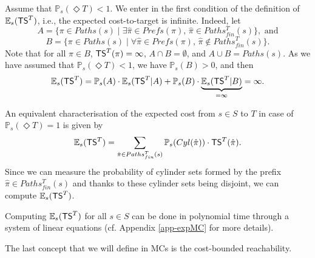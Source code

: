 \begin{remark}
Assume that $\mathbb{P}_s(\Diamond T) < 1$. We enter in the first condition of the definition of $\mathbb{E}_s(\text{\sffamily TS}^T)$, i.e., the expected cost-to-target is infinite. Indeed, let
\[A = \{\pi \in Paths(s) \; | \; \exists \hat{\pi} \in Prefs(\pi), \, \hat{\pi} \in Paths^T_{fin}(s)\}, \text{ and}\]
\[B=\{ \pi \in Paths(s) \; | \; \forall
\hat{\pi} \in Prefs(\pi), \, \hat{\pi} \not\in Paths^T_{fin}(s)\}.\]
Note that for all $\pi \in B$, $\text{\sffamily TS}^T(\pi) = \infty$,
$A \cap B = \emptyset$, and $A \cup B = Paths(s)$.
As we have assumed that $\mathbb{P}_s(\Diamond T) < 1$,
we have $\mathbb{P}_s(B) > 0$, and then
\[
  \mathbb{E}_s(\text{\sffamily TS}^T) = \mathbb{P}_s(A) \cdot \mathbb{E}_s(\text{\sffamily TS}^T | A) + \mathbb{P}_s(B) \cdot \underbrace{\mathbb{E}_s(\text{\sffamily TS}^T | B)}_{=\infty} = \infty.
\]
\end{remark}
\begin{remark}
An equivalent characterisation of the expected cost from $s \in S$ to $T$ in case of $\mathbb{P}_s(\Diamond T) = 1$ is given by
\[
  \mathbb{E}_s(\text{\sffamily TS}^T) = \sum_{\hat{\pi} \in Paths_{fin}^T(s)} \mathbb{P}_s(Cyl(\hat{\pi})) \cdot \text{\sffamily TS}^T(\hat{\pi}).
\]
Since we can measure the probability of cylinder sets formed by the prefix $\hat{\pi} \in Paths_{fin}^T(s)$ and thanks to these cylinder sets being disjoint, we can compute $\mathbb{E}_s(\text{\sffamily TS}^T)$.
\end{remark}

\begin{theorem}
  Computing $\mathbb{E}_s(\text{\sffamily TS}^T)$ for all $s \in S$ can be done in polynomial time through a system of linear equations (cf. Appendix \ref{app-expMC} for more details).
\end{theorem}

The last concept that we will define in MCs is the cost-bounded reachability.

